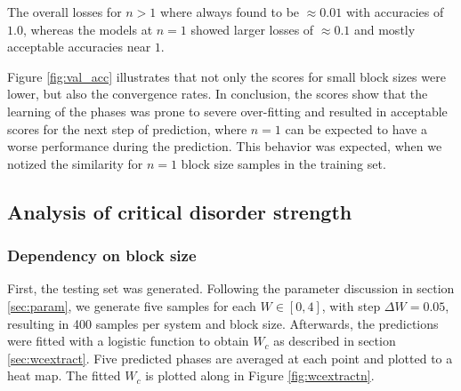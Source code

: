 \documentclass[reprint,amsmath,amssymb,aps,prb]{revtex4-2}
\begin{document}
The overall losses for $n>1$ where always found to be $\approx 0.01$ with accuracies of $1.0$, whereas the models at $n=1$ showed larger losses of  $\approx 0.1$ and mostly acceptable accuracies near $1$.

Figure \ref{fig:val_acc} illustrates that not only the scores for small block sizes were lower, but also the convergence rates. In conclusion, the scores show that the learning of the phases was prone to severe over-fitting and resulted in acceptable scores for the next step of prediction, where $n=1$ can be expected to have a worse performance during the prediction. This behavior was expected, when we notized the similarity for $n=1$ block size samples in the training set.

\subsection{Analysis of critical disorder strength}
\subsubsection{Dependency on block size}
First, the testing set was generated. Following the parameter discussion in section \ref{sec:param}, we generate five samples for each $W\in\left[0,4\right]$, with step $\Delta W=0.05$, resulting in 400 samples per system and block size. Afterwards, the predictions were fitted with a logistic function to obtain $W_c$ as described in section \ref{sec:wcextract}.
Five predicted phases are averaged at each point and plotted to a heat map. The fitted $W_c$ is plotted along in Figure \ref{fig:wcextractn}.
\end{document}
